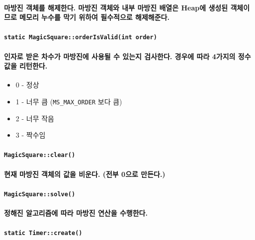 \documentclass[UTF8]{report}
\begin{document}
            \paragraph{%
                \normalfont 마방진 객체를 해제한다. 마방진 객체와 내부 마방진 배열은 Heap에 생성된 객체이므로 메모리 누수를 막기 위하여 필수적으로 해제해준다.
            }

            \paragraph{\texttt{static MagicSquare::orderIsValid(int order)}}
            \paragraph{%
                \normalfont 인자로 받은 차수가 마방진에 사용될 수 있는지 검사한다. 경우에 따라 4가지의 정수 값을 리턴한다.
            }

            \begin{itemize}
                \item 0 - 정상
                \item 1 - 너무 큼 (\texttt{MS\_MAX\_ORDER} 보다 큼)
                \item 2 - 너무 작음
                \item 3 - 짝수임
            \end{itemize}

            \paragraph{\texttt{MagicSquare::clear()}}
            \paragraph{%
                \normalfont 현재 마방진 객체의 값을 비운다. (전부 0으로 만든다.)
            }

            \paragraph{\texttt{MagicSquare::solve()}}
            \paragraph{%
                \normalfont 정해진 알고리즘에 따라 마방진 연산을 수행한다.
            }

            \paragraph{\texttt{static Timer::create()}}
\end{document}
